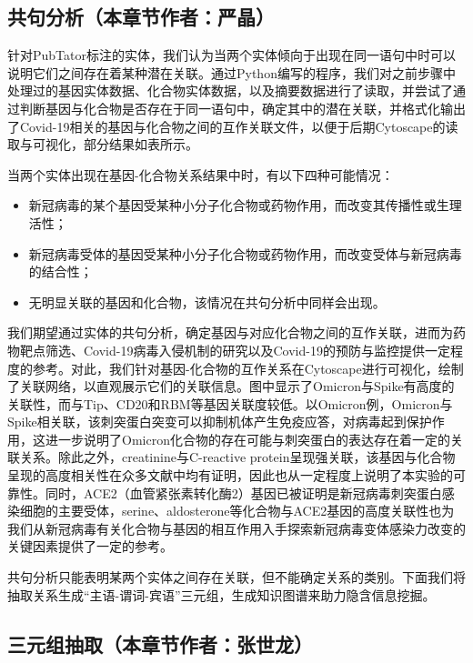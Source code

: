 \documentclass[twocolumn]{article}
\begin{document}
\subsection{共句分析（本章节作者：严晶）\label{chap:cosentence}}
针对PubTator标注的实体，我们认为当两个实体倾向于出现在同一语句中时可以说明它们之间存在着某种潜在关联。通过Python编写的程序，我们对之前步骤中处理过的基因实体数据、化合物实体数据，以及摘要数据进行了读取，并尝试了通过判断基因与化合物是否存在于同一语句中，确定其中的潜在关联，并格式化输出了Covid-19相关的基因与化合物之间的互作关联文件，以便于后期Cytoscape的读取与可视化，部分结果如表所示。\par
当两个实体出现在基因-化合物关系结果中时，有以下四种可能情况：
\begin{itemize}
	\item 新冠病毒的某个基因受某种小分子化合物或药物作用，而改变其传播性或生理活性；
	\item 新冠病毒受体的基因受某种小分子化合物或药物作用，而改变受体与新冠病毒的结合性；
	\item 无明显关联的基因和化合物，该情况在共句分析中同样会出现。
\end{itemize}

我们期望通过实体的共句分析，确定基因与对应化合物之间的互作关联，进而为药物靶点筛选、Covid-19病毒入侵机制的研究以及Covid-19的预防与监控提供一定程度的参考。对此，我们针对基因-化合物的互作关系在Cytoscape进行可视化，绘制了关联网络，以直观展示它们的关联信息。图中显示了Omicron与Spike有高度的关联性，而与Tip、CD20和RBM等基因关联度较低。以Omicron例，Omicron与Spike相关联，该刺突蛋白突变可以抑制机体产生免疫应答，对病毒起到保护作用\cite{spike}，这进一步说明了Omicron化合物的存在可能与刺突蛋白的表达存在着一定的关联关系。除此之外，creatinine与C-reactive protein呈现强关联，该基因与化合物呈现的高度相关性在众多文献中均有证明，因此也从一定程度上说明了本实验的可靠性。同时，ACE2（血管紧张素转化酶2）基因已被证明是新冠病毒刺突蛋白感染细胞的主要受体，serine、aldosterone等化合物与ACE2基因的高度关联性也为我们从新冠病毒有关化合物与基因的相互作用入手探索新冠病毒变体感染力改变的关键因素提供了一定的参考。\par
共句分析只能表明某两个实体之间存在关联，但不能确定关系的类别。下面我们将抽取关系生成“主语-谓词-宾语”三元组，生成知识图谱来助力隐含信息挖掘。\par

\subsection{三元组抽取（本章节作者：张世龙）\label{chap:triple}}
\end{document}
